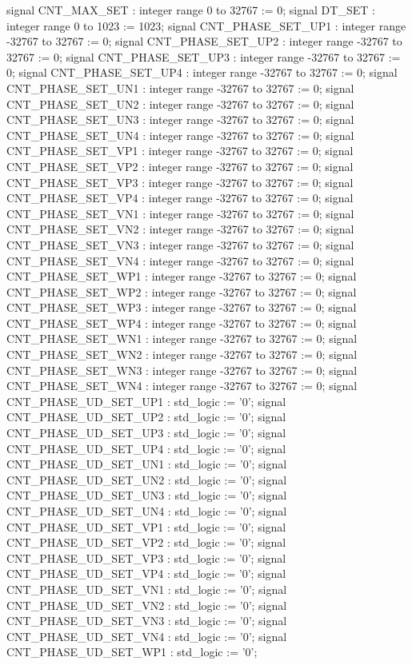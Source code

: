 \begin{mylisting}[language=VHDL,caption=ゲート信号出力モジュール,label=MMC_PWM_GEN_module_VHDL]
	signal CNT_MAX_SET			: integer range 0 to 32767			:= 0;
	signal DT_SET					: integer range 0 to 1023			:= 1023;
	signal CNT_PHASE_SET_UP1	: integer range -32767 to 32767		:= 0;
	signal CNT_PHASE_SET_UP2	: integer range -32767 to 32767		:= 0;
	signal CNT_PHASE_SET_UP3	: integer range -32767 to 32767		:= 0;
	signal CNT_PHASE_SET_UP4	: integer range -32767 to 32767		:= 0;
	signal CNT_PHASE_SET_UN1	: integer range -32767 to 32767		:= 0;
	signal CNT_PHASE_SET_UN2	: integer range -32767 to 32767		:= 0;
	signal CNT_PHASE_SET_UN3	: integer range -32767 to 32767		:= 0;
	signal CNT_PHASE_SET_UN4	: integer range -32767 to 32767		:= 0;
	signal CNT_PHASE_SET_VP1	: integer range -32767 to 32767		:= 0;
	signal CNT_PHASE_SET_VP2	: integer range -32767 to 32767		:= 0;
	signal CNT_PHASE_SET_VP3	: integer range -32767 to 32767		:= 0;
	signal CNT_PHASE_SET_VP4	: integer range -32767 to 32767		:= 0;
	signal CNT_PHASE_SET_VN1	: integer range -32767 to 32767		:= 0;
	signal CNT_PHASE_SET_VN2	: integer range -32767 to 32767		:= 0;
	signal CNT_PHASE_SET_VN3	: integer range -32767 to 32767		:= 0;
	signal CNT_PHASE_SET_VN4	: integer range -32767 to 32767		:= 0;
	signal CNT_PHASE_SET_WP1	: integer range -32767 to 32767		:= 0;
	signal CNT_PHASE_SET_WP2	: integer range -32767 to 32767		:= 0;
	signal CNT_PHASE_SET_WP3	: integer range -32767 to 32767		:= 0;
	signal CNT_PHASE_SET_WP4	: integer range -32767 to 32767		:= 0;
	signal CNT_PHASE_SET_WN1	: integer range -32767 to 32767		:= 0;
	signal CNT_PHASE_SET_WN2	: integer range -32767 to 32767		:= 0;
	signal CNT_PHASE_SET_WN3	: integer range -32767 to 32767		:= 0;
	signal CNT_PHASE_SET_WN4	: integer range -32767 to 32767		:= 0;
	signal CNT_PHASE_UD_SET_UP1	: std_logic							:= '0';
	signal CNT_PHASE_UD_SET_UP2	: std_logic							:= '0';
	signal CNT_PHASE_UD_SET_UP3	: std_logic							:= '0';
	signal CNT_PHASE_UD_SET_UP4	: std_logic							:= '0';
	signal CNT_PHASE_UD_SET_UN1	: std_logic							:= '0';
	signal CNT_PHASE_UD_SET_UN2	: std_logic							:= '0';
	signal CNT_PHASE_UD_SET_UN3	: std_logic							:= '0';
	signal CNT_PHASE_UD_SET_UN4	: std_logic							:= '0';
	signal CNT_PHASE_UD_SET_VP1	: std_logic							:= '0';
	signal CNT_PHASE_UD_SET_VP2	: std_logic							:= '0';
	signal CNT_PHASE_UD_SET_VP3	: std_logic							:= '0';
	signal CNT_PHASE_UD_SET_VP4	: std_logic							:= '0';
	signal CNT_PHASE_UD_SET_VN1	: std_logic							:= '0';
	signal CNT_PHASE_UD_SET_VN2	: std_logic							:= '0';
	signal CNT_PHASE_UD_SET_VN3	: std_logic							:= '0';
	signal CNT_PHASE_UD_SET_VN4	: std_logic							:= '0';
	signal CNT_PHASE_UD_SET_WP1	: std_logic							:= '0';

\end{mylisting}
